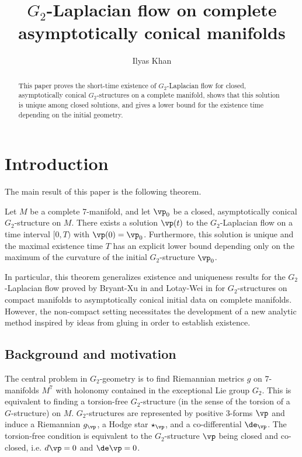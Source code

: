 \documentclass[hidelinks, 12pt, oneside, reqno]{amsart}
\title[Laplacian flow on complete asymptotically conical manifolds]{$G_2$-Laplacian flow on complete asymptotically conical manifolds}
\author[Khan]{Ilyas Khan}
\date{}
\begin{document}
\begin{abstract}
This paper proves the short-time existence of $G_2$-Laplacian flow for closed, asymptotically conical $G_2$-structures on a complete manifold, shows that this solution is unique among closed solutions, and gives a lower bound for the existence time depending on the initial geometry. 
\end{abstract}

\maketitle

\tableofcontents

\vspace{-.3in}

\section{Introduction}

The main result of this paper is the following theorem. 

\begin{thm}\label{theorem main theorem}
    Let $M$ be a complete 7-manifold, and let $\vp_0$ be a closed, asymptotically conical $G_2$-structure on $M$. There exists a solution $\vp(t)$ to the $G_2$-Laplacian flow on a time interval $[0,T)$ with $\vp(0) = \vp_0$. Furthermore, this solution is unique and the maximal existence time $T$ has an explicit lower bound depending only on the maximum of the curvature of the initial $G_2$-structure $\vp_0$.
\end{thm}

In particular, this theorem generalizes existence and uniqueness results for the $G_2$-Laplacian flow proved by Bryant-Xu in \cite{BryantXu} and Lotay-Wei in \cite{LotayWeiLaplacianFlow} for $G_2$-structures on compact manifolds to asymptotically conical initial data on complete manifolds. However, the non-compact setting necessitates the development of a new analytic method inspired by ideas from gluing in order to establish existence.

\subsection{Background and motivation}

The central problem in $G_2$-geometry is to find Riemannian metrics $g$ on $7$-manifolds $M^7$ with holonomy contained in the exceptional Lie group $G_2$. This is equivalent to finding a torsion-free $G_2$-structure (in the sense of the torsion of a $G$-structure) on $M$. $G_2$-structures are represented by positive 3-forms $\vp$ and induce a Riemannian $g_\vp$, a Hodge star $\star_\vp$, and a co-differential $\de_\vp$. The torsion-free condition is equivalent to the $G_2$-structure $\vp$ being closed and co-closed, i.e. $d \vp = 0$ and $\de \vp = 0$. 
\end{document}
